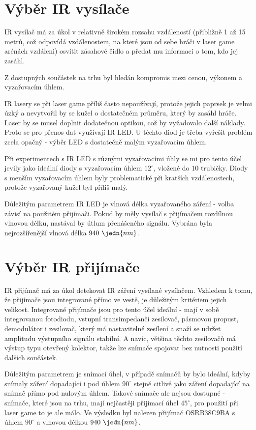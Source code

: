 \section{Výběr IR vysílače}
IR vysílač má za úkol v relativně širokém rozsahu vzdáleností (přibližně 1 až 15 metrů, což odpovídá vzdálenostem, na které jsou od sebe hráči v laser game arénách vzdáleni) osvítit zásahové čidlo a předat mu informaci o tom, kdo jej zasáhl.

Z dostupných součástek na trhu byl hledán kompromis mezi cenou, výkonem a vyzařovacím úhlem.

IR lasery se při laser game příliš často nepoužívají, protože jejich paprsek je velmi úzký a nevytvořil by se kužel o dostatečném průměru, který by zasáhl hráče. Laser by se musel doplnit dodatečnou optikou, což by vyžadovalo další náklady. Proto se pro přenos dat využívají IR LED. U těchto diod je třeba vyřešit problém zcela opačný - výběr LED s dostatečně malým vyzařovacím úhlem.

Při experimentech s IR LED s různými vyzařovacími úhly se mi pro tento účel jevily jako ideální diody s vyzařovacím úhlem $12^\circ$, vložené do $10$ trubičky. Diody s menším vyzařovacím úhlem byly problematické při kratších vzdálenostech, protože vyzařovaný kužel byl příliš malý.

Důležitým parametrem IR LED je vlnová délka vyzařovaného záření - volba závisí na použitém přijímači. Pokud by měly vysílač s přijímačem rozdílnou vlnovou délku, nastával by útlum přenášeného signálu. Vybrána byla nejrozšířenější vlnová délka $940~\jedn{nm}$.

\section{Výběr IR přijímače}
IR přijímač má za úkol detekovat IR záření vysílané vysílačem. Vzhledem k tomu, že přijímače jsou integrované přímo ve vestě, je důležitým kritériem jejich velikost. Integrované přijímače jsou pro tento účel ideální - mají v sobě integrovanou fotodiodu, vstupní transimpedančí zesilovač, pásmovou propust, demodulátor i zesilovač, který má nastavitelné zesílení a snaží se udržet amplitudu výstupního signálu stabilní. A navíc, většina těchto zesilovačů má výstup typu otevřený kolektor, takže lze snímače spojovat bez nutnosti použití dalších součástek.

Důležitým parametrem je snímací úhel, v případě snímačů by bylo ideální, kdyby snímaly záření dopadající i pod úhlem $90^\circ$ stejně citlivě jako záření dopadající na snímač přímo pod nulovým úhlem. Takové snímače ale nejsou dostupné - snímače, které jsou na trhu, mají nejčastěji přijímací úhel $45^\circ$, pro použití při laser game to je ale málo. Ve výsledku byl nalezen přijímač OSRB38C9BA s úhlem $90^\circ$ a vlnovou délkou $940~\jedn{nm}$.

